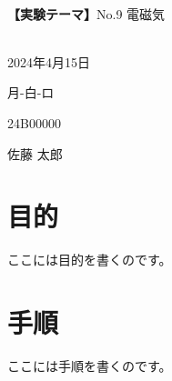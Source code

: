 \documentclass[a4paper]{ltjsreport}
\begin{document}
\begin{multicols}{2}
\vspace*{5px}
\\
{\large \textbf{【実験テーマ】}No.9 電磁気}
\vspace*{10px}
\\
\\
\begin{description}[labelwidth=6.0em]
  \setlength{\leftskip}{3.8cm}
  \item[実験日] 2024年4月15日
  \item[曜日-組-班] 月-白-ロ
  \item[学籍番号] 24B00000
  \item[名前] 佐藤 太郎
\end{description}
\end{multicols}

\section*{目的}
ここには目的を書くのです。
\section*{手順}
ここには手順を書くのです。
\end{document}
